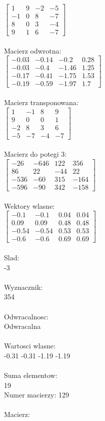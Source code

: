 \documentclass[a4paper,12pt]{article}
\begin{document}
$\begin{bmatrix} 1&9&-2&-5\\-1&0&8&-7\\8&0&3&-4\\9&1&6&-7 \end{bmatrix}$
\\
\\
Macierz odwrotna:\\

$\begin{bmatrix} -0.03&-0.14&-0.2&0.28\\-0.03&-0.4&-1.46&1.25\\-0.17&-0.41&-1.75&1.53\\-0.19&-0.59&-1.97&1.7 \end{bmatrix}$
\\
\\
Macierz transponowana:\\

$\begin{bmatrix} 1&-1&8&9\\9&0&0&1\\-2&8&3&6\\-5&-7&-4&-7 \end{bmatrix}$
\\
\\
Macierz do potegi 3:\\

$\begin{bmatrix} -26&-646&122&356\\86&22&-44&22\\-536&-60&315&-164\\-596&-90&342&-158 \end{bmatrix}$
\\
\\
Wektory wlasne:\\

$\begin{bmatrix} -0.1&-0.1&0.04&0.04\\0.09&0.09&0.48&0.48\\-0.54&-0.54&0.53&0.53\\-0.6&-0.6&0.69&0.69 \end{bmatrix}$
\\
\\
Slad:\\
-3
\\
\\
Wyznacznik:\\
354
\\
\\
Odwracalnosc:\\
Odwracalna
\\
\\
Wartosci wlasne:\\
-0.31 -0.31 -1.19 -1.19
\\
\\
Suma elementow:\\
19
\\
\newpage
Numer macierzy:
129
\\
\\
Macierz:\\
\end{document}
